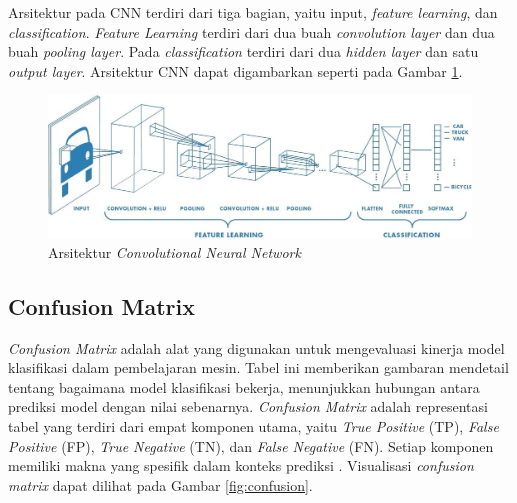 Arsitektur pada CNN terdiri dari tiga bagian, yaitu input, \emph{feature learning}, dan \emph{classification}. \emph{Feature Learning} terdiri dari dua buah \emph{convolution layer} dan dua buah \emph{pooling layer}. Pada \emph{classification} terdiri dari dua \emph{hidden layer} dan satu \emph{output layer}. Arsitektur CNN dapat digambarkan seperti pada Gambar \ref{fig:arsitektur cnn}.

\begin{figure} [ht] \centering
    \includegraphics[scale=0.2]{gambar/cnn.jpg}
    \caption{Arsitektur \emph{Convolutional Neural Network}}
    \label{fig:arsitektur cnn}
\end{figure}

\subsection{Confusion Matrix}

\emph{Confusion Matrix} adalah alat yang digunakan untuk mengevaluasi kinerja model klasifikasi dalam pembelajaran mesin. Tabel ini memberikan gambaran mendetail tentang bagaimana model klasifikasi bekerja, menunjukkan hubungan antara prediksi model dengan nilai sebenarnya. \emph{Confusion Matrix} adalah representasi tabel yang terdiri dari empat komponen utama, yaitu \emph{True Positive} (TP), \emph{False Positive} (FP), \emph{True Negative} (TN), dan \emph{False Negative} (FN). Setiap komponen memiliki makna yang spesifik dalam konteks prediksi \cite{provost2013data}. Visualisasi \emph{confusion matrix} dapat dilihat pada Gambar \ref{fig:confusion}.

